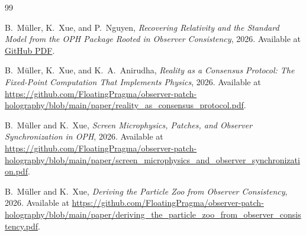 \begin{thebibliography}{99}

B.~M\"uller, K.~Xue, and P.~Nguyen,
\emph{Recovering Relativity and the Standard Model from the OPH Package Rooted in Observer Consistency},
2026.
Available at \href{https://github.com/FloatingPragma/observer-patch-holography/blob/main/paper/recovering_relativity_and_standard_model_structure_from_observer_overlap_consistency_compact.pdf}{GitHub PDF}.

B.~M\"uller, K.~Xue, and K.~A.~Anirudha,
\emph{Reality as a Consensus Protocol: The Fixed-Point Computation That Implements Physics},
2026.
Available at \url{https://github.com/FloatingPragma/observer-patch-holography/blob/main/paper/reality_as_consensus_protocol.pdf}.

B.~M\"uller and K.~Xue,
\emph{Screen Microphysics, Patches, and Observer Synchronization in OPH},
2026.
Available at \url{https://github.com/FloatingPragma/observer-patch-holography/blob/main/paper/screen_microphysics_and_observer_synchronization.pdf}.

B.~M\"uller and K.~Xue,
\emph{Deriving the Particle Zoo from Observer Consistency},
2026.
Available at \url{https://github.com/FloatingPragma/observer-patch-holography/blob/main/paper/deriving_the_particle_zoo_from_observer_consistency.pdf}.



\end{thebibliography}

